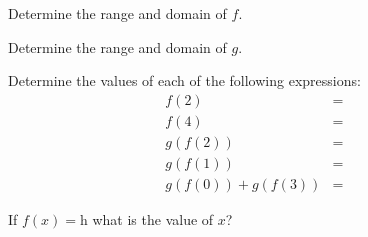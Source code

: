 \begin{problem}
  \begin{subproblem}
  \item Determine the range and domain of $f$.
    \vspace{2em}
  \item Determine the range and domain of $g$.
    \vspace{2em}
  \item Determine the values of each of the following expressions:
    \begin{eqnarray*}
      f(2) & = & \\
      f(4) & = & \\
      g(f(2)) & = & \\
      g(f(1)) & = & \\
      g(f(0))+g(f(3)) & = &
    \end{eqnarray*}
  \item If $f(x)=$h what is the value of $x$?
  \end{subproblem}

  \clearpage

\end{problem}

\postClass

